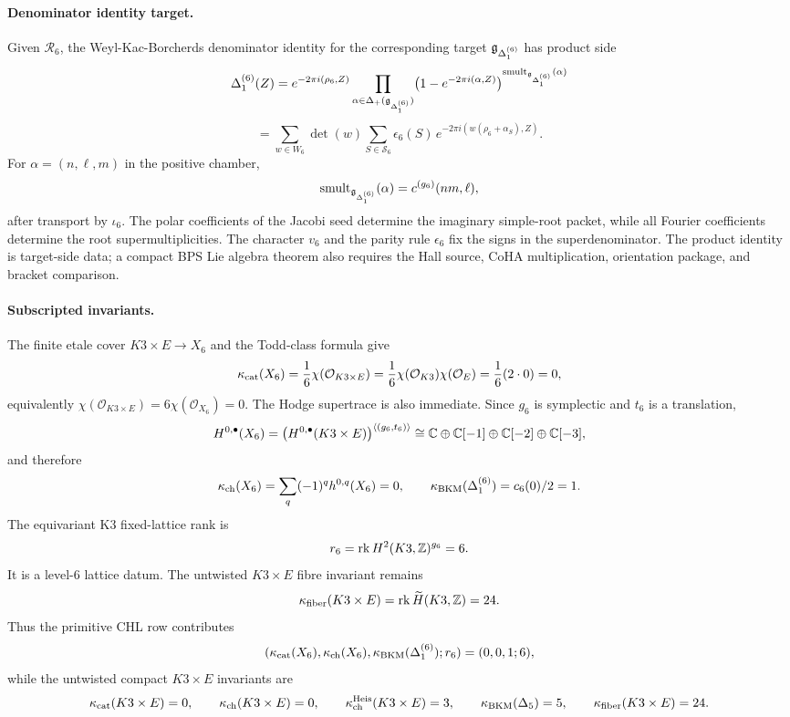 \paragraph{Denominator identity target.}
Given $\mathscr R_6$, the Weyl-Kac-Borcherds denominator identity for
the corresponding target $\mathfrak{g}_{\Delta_{1}^{(6)}}$ has product side
\[
  \Delta_{1}^{(6)}(Z)
  =e^{-2\pi i(\rho_6,Z)}
  \prod_{\alpha\in\Delta_+(\mathfrak{g}_{\Delta_{1}^{(6)}})}
  \bigl(1-e^{-2\pi i(\alpha,Z)}\bigr)^{
    \operatorname{smult}_{\mathfrak{g}_{\Delta_{1}^{(6)}}}(\alpha)}
\]
\[
  =\sum_{w\in W_6}\det(w)
  \sum_{S\in\mathcal S_6}
  \epsilon_6(S)\,
  e^{-2\pi i(w(\rho_6+\alpha_S),Z)} .
\]
For $\alpha=(n,\ell,m)$ in the positive chamber,
\[
  \operatorname{smult}_{\mathfrak{g}_{\Delta_{1}^{(6)}}}(\alpha)=c^{(g_6)}(nm,\ell),
\]
after transport by $\iota_6$. The polar coefficients of the Jacobi seed
determine the imaginary simple-root packet, while all Fourier
coefficients determine the root supermultiplicities. The
character $v_6$ and the parity rule $\epsilon_6$ fix the signs in the
superdenominator. The product identity is target-side data; a compact
BPS Lie algebra theorem also requires the Hall source, CoHA
multiplication, orientation package, and bracket comparison.

\paragraph{Subscripted invariants.}
The finite etale cover $K3\times E\to X_6$ and the Todd-class formula
give
\[
  \kappa_{\mathrm{cat}}(X_6)=\frac{1}{6}\chi(\mathcal{O}_{K3\times E})
  =\frac{1}{6}\chi(\mathcal{O}_{K3})\chi(\mathcal{O}_E)
  =\frac{1}{6}(2\cdot0)=0,
\]
equivalently $\chi(\mathcal O_{K3\times E})=6\chi(\mathcal O_{X_6})=0$.
The Hodge supertrace is also immediate. Since $g_6$ is symplectic and
$t_6$ is a translation,
\[
  H^{0,\bullet}(X_6)=
  \bigl(H^{0,\bullet}(K3\times E)\bigr)^{\langle(g_6,t_6)\rangle}
  \cong
  \mathbb{C}\oplus\mathbb{C}[-1]\oplus\mathbb{C}[-2]\oplus\mathbb{C}[-3],
\]
and therefore
\[
  \kappa_{\mathrm{ch}}(X_6)=\sum_q(-1)^qh^{0,q}(X_6)=0,
  \qquad
  \kappa_{\mathrm{BKM}}(\Delta_{1}^{(6)})=c_6(0)/2=1 .
\]
The equivariant K3 fixed-lattice rank is
\[
  r_6=\mathrm{rk}\,H^2(K3,\mathbb{Z})^{g_6}=6 .
\]
It is a level-$6$ lattice datum. The untwisted $K3\times E$ fibre
invariant remains
\[
  \kappa_{\mathrm{fiber}}(K3\times E)=\mathrm{rk}\,\widetilde H(K3,\mathbb{Z})=24.
\]
Thus the primitive CHL row contributes
\[
  (\kappa_{\mathrm{cat}}(X_6),\kappa_{\mathrm{ch}}(X_6),\kappa_{\mathrm{BKM}}(\Delta_{1}^{(6)});r_6)=(0,0,1;6),
\]
while the untwisted compact $K3\times E$ invariants are
\[
  \kappa_{\mathrm{cat}}(K3\times E)=0,\qquad \kappa_{\mathrm{ch}}(K3\times E)=0,\qquad
  \kappa_{\mathrm{ch}}^{\mathrm{Heis}}(K3\times E)=3,\qquad
  \kappa_{\mathrm{BKM}}(\Delta_5)=5,\qquad \kappa_{\mathrm{fiber}}(K3\times E)=24 .
\]

